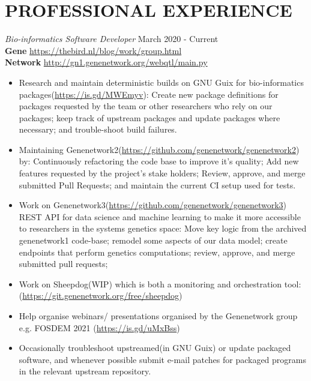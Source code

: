 \documentclass[margin, line]{res} %
\begin{document}


\section{PROFESSIONAL EXPERIENCE}

{\sl Bio-informatics Software Developer} \hfill March 2020 - Current \\
\textbf{Gene} \hfill \url{https://thebird.nl/blog/work/group.html} \\
\textbf{Network} \hfill \url{http://gn1.genenetwork.org/webqtl/main.py}

\begin{itemize} \itemsep -2pt
\item Research and maintain deterministic builds on GNU Guix for
  bio-informatics packages(\url{https://is.gd/MWEmyv}): Create new
  package definitions for packages requested by the team or other
  researchers who rely on our packages; keep track of upstream
  packages and update packages where necessary; and trouble-shoot
  build failures.
\item Maintaining
  Genenetwork2(\url{https://github.com/genenetwork/genenetwork2}) by:
  Continuously refactoring the code base to improve it's quality; Add
  new features requested by the project's stake holders; Review,
  approve, and merge submitted Pull Requests; and maintain the current
  CI setup used for tests.
\item Work on
  Genenetwork3(\url{https://github.com/genenetwork/genenetwork3}) REST
  API for data science and machine learning to make it more accessible
  to researchers in the systems genetics space: Move key logic from
  the archived genenetwork1 code-base; remodel some aspects of our data
  model; create endpoints that perform genetics computations; review,
  approve, and merge submitted pull requests;
\item Work on Sheepdog(WIP) which is both a monitoring and
  orchestration tool:
  (\url{https://git.genenetwork.org/free/sheepdog})
\item Help organise webinars/ presentations organised by the
  Genenetwork group e.g. FOSDEM 2021 (\url{https://is.gd/uMxBss})
\item Occasionally troubleshoot upstreamed(in GNU Guix) or update
  packaged software, and whenever possible submit e-mail patches for
  packaged programs in the relevant upstream repository.
\end{itemize}
\end{document}
